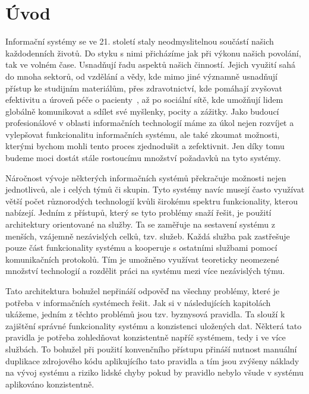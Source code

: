 

\chapter{Úvod}\label{ch:uvod}


Informační systémy se ve 21. století staly neodmyslitelnou součástí našich každodenních životů.
Do styku s nimi přicházíme jak při výkonu našich povolání, tak ve volném čase. Usnadňují
řadu aspektů našich činností. Jejich využití sahá do mnoha sektorů, od vzdělání a vědy,
kde mimo jiné významně usnadňují přístup ke studijním materiálům, přes zdravotnictví,
kde pomáhají zvyšovat efektivitu a úroveň péče o pacienty~\cite{fichman2011editorial}, až po
sociální sítě, kde umožňují lidem globálně komunikovat a sdílet své myšlenky, pocity a zážitky.
Jako budoucí profesionálové v oblasti informačních technologií máme za úkol nejen
rozvíjet a vylepšovat funkcionalitu informačních systému, ale také zkoumat možnosti, kterými
bychom mohli tento proces zjednodušit a zefektivnit. Jen díky tomu budeme moci dostát stále
rostoucímu množství požadavků na tyto systémy.

Náročnost vývoje některých informačních systémů překračuje možnosti nejen jednotlivců, ale
i celých týmů či skupin. Tyto systémy navíc musejí často využívat větší počet různorodých technologií kvůli
širokému spektru funkcionality, kterou nabízejí. Jedním z přístupů, který se tyto problémy snaží řešit,
je použití architektury orientované na služby. Ta se zaměřuje na sestavení systému z menších, vzájemně
nezávislých celků, tzv. služeb. Každá služba pak zastřešuje pouze část funkcionality systému a kooperuje
s ostatními službami pomocí komunikačních protokolů. Tím je umožněno využívat teoreticky neomezené množství
technologií a rozdělit práci na systému mezi více nezávislých týmu.

Tato architektura bohužel nepřináší odpověď na všechny problémy, které je potřeba v informačních
systémech řešit. Jak si v následujících kapitolách ukážeme, jedním z těchto problémů jsou tzv. byznysová
pravidla. Ta slouží k zajištění správné funkcionality systému a konzistenci uložených dat.
Některá tato pravidla je potřeba zohledňovat konzistentně napříč systémem, tedy i ve více službách.
To bohužel při použití konvenčního přístupu přináší nutnost manuální duplikace zdrojového
kódu aplikujícího tato pravidla a tím jsou zvýšeny náklady na vývoj systému a riziko lidské chyby
pokud by pravidlo nebylo všude v systému aplikováno konzistentně.

